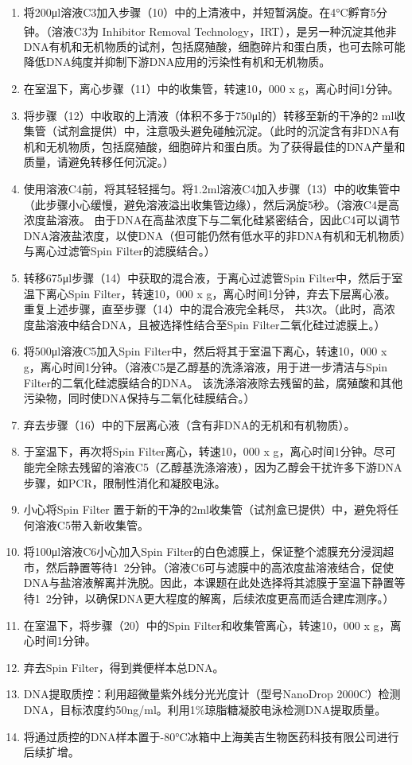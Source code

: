 \begin{enumerate}
      \item 将200μl溶液C3加入步骤（10）中的上清液中，并短暂涡旋。在4°C孵育5分钟。（溶液C3为 Inhibitor Removal Technology\textsuperscript{\textregistered}，IRT），是另一种沉淀其他非DNA有机和无机物质的试剂，包括腐殖酸，细胞碎片和蛋白质，也可去除可能降低DNA纯度并抑制下游DNA应用的污染性有机和无机物质。
      \item 在室温下，离心步骤（11）中的收集管，转速10，000 x g，离心时间1分钟。
      \item 将步骤（12）中收取的上清液（体积不多于750μl的）转移至新的干净的2 ml收集管（试剂盒提供）中，注意吸头避免碰触沉淀。（此时的沉淀含有非DNA有机和无机物质，包括腐殖酸，细胞碎片和蛋白质。为了获得最佳的DNA产量和质量，请避免转移任何沉淀。）
      \item 使用溶液C4前，将其轻轻摇匀。将1.2ml溶液C4加入步骤（13）中的收集管中（此步骤小心缓慢，避免溶液溢出收集管边缘），然后涡旋5秒。（溶液C4是高浓度盐溶液。 由于DNA在高盐浓度下与二氧化硅紧密结合，因此C4可以调节DNA溶液盐浓度，以使DNA（但可能仍然有低水平的非DNA有机和无机物质）与离心过滤管Spin Filter的滤膜结合。）
      \item 转移675μl步骤（14）中获取的混合液，于离心过滤管Spin Filter中，然后于室温下离心Spin Filter，转速10，000 x g，离心时间1分钟，弃去下层离心液。重复上述步骤，直至步骤（14）中的混合液完全耗尽， 共3次。（此时，高浓度盐溶液中结合DNA，且被选择性结合至Spin Filter二氧化硅过滤膜上。）
      \item 将500μl溶液C5加入Spin Filter中，然后将其于室温下离心，转速10，000 x g，离心时间1分钟。（溶液C5是乙醇基的洗涤溶液，用于进一步清洁与Spin Filter的二氧化硅滤膜结合的DNA。 该洗涤溶液除去残留的盐，腐殖酸和其他污染物，同时使DNA保持与二氧化硅膜结合。）
      \item 弃去步骤（16）中的下层离心液（含有非DNA的无机和有机物质）。
      \item 于室温下，再次将Spin Filter离心，转速10，000 x g，离心时间1分钟。尽可能完全除去残留的溶液C5（乙醇基洗涤溶液），因为乙醇会干扰许多下游DNA步骤，如PCR，限制性消化和凝胶电泳。
      \item 小心将Spin Filter 置于新的干净的2ml收集管（试剂盒已提供）中，避免将任何溶液C5带入新收集管。
      \item 将100μl溶液C6小心加入Spin Filter的白色滤膜上，保证整个滤膜充分浸润超市，然后静置等待1~2分钟。（溶液C6可与滤膜中的高浓度盐溶液结合，促使DNA与盐溶液解离并洗脱。因此，本课题在此处选择将其滤膜于室温下静置等待1~2分钟，以确保DNA更大程度的解离，后续浓度更高而适合建库测序。）
      \item 在室温下，将步骤（20）中的Spin Filter和收集管离心，转速10，000 x g，离心时间1分钟。
      \item 弃去Spin Filter，得到粪便样本总DNA。
      \item DNA提取质控：利用超微量紫外线分光光度计（型号NanoDrop 2000C）检测DNA，目标浓度约50ng/ml。利用1\%琼脂糖凝胶电泳检测DNA提取质量。
      \item 将通过质控的DNA样本置于-80°C冰箱中上海美吉生物医药科技有限公司进行后续扩增。
    \end{enumerate}

